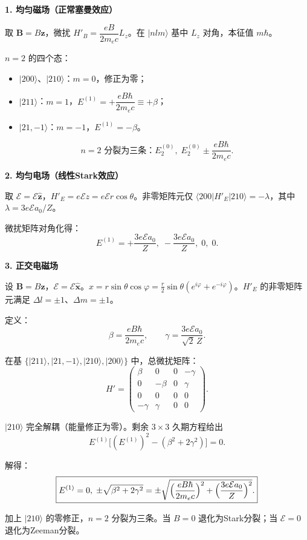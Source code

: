 \begin{derivationbox}[标准解题过程]
\textbf{1. 均匀磁场（正常塞曼效应）}

取 $\mathbf{B}=B\hat{\mathbf{z}}$，微扰 $H'_B=\dfrac{eB}{2m_ec}L_z$。在 $|nlm\rangle$ 基中 $L_z$ 对角，本征值 $m\hbar$。

$n=2$ 的四个态：
\begin{itemize}
    \item $|200\rangle$、$|210\rangle$：$m=0$，修正为零；
    \item $|211\rangle$：$m=1$，$E^{(1)}=+\dfrac{eB\hbar}{2m_ec}\equiv+\beta$；
    \item $|21,-1\rangle$：$m=-1$，$E^{(1)}=-\beta$。
\end{itemize}

\begin{equation}
\boxed{n=2\text{ 分裂为三条：}E_2^{(0)},\;E_2^{(0)}\pm\frac{eB\hbar}{2m_ec}.}
\end{equation}

\textbf{2. 均匀电场（线性Stark效应）}

取 $\boldsymbol{\mathcal{E}}=\mathcal{E}\hat{\mathbf{z}}$，$H'_E=e\mathcal{E}z=e\mathcal{E}r\cos\theta$。非零矩阵元仅 $\langle200|H'_E|210\rangle=-\lambda$，其中$\lambda=3e\mathcal{E}a_0/Z$。

微扰矩阵对角化得：
\begin{equation}
\boxed{E^{(1)}=+\frac{3e\mathcal{E}a_0}{Z},\;-\frac{3e\mathcal{E}a_0}{Z},\;0,\;0.}
\end{equation}

\textbf{3. 正交电磁场}

设 $\mathbf{B}=B\hat{\mathbf{z}}$，$\boldsymbol{\mathcal{E}}=\mathcal{E}\hat{\mathbf{x}}$。$x=r\sin\theta\cos\varphi=\frac{r}{2}\sin\theta(e^{i\varphi}+e^{-i\varphi})$。$H'_E$ 的非零矩阵元满足 $\Delta l=\pm1$、$\Delta m=\pm1$。

定义：
\[
\beta=\frac{eB\hbar}{2m_ec},\qquad\gamma=\frac{3e\mathcal{E}a_0}{\sqrt2\,Z}.
\]

在基 $\{|211\rangle,|21,-1\rangle,|210\rangle,|200\rangle\}$ 中，总微扰矩阵：
\[
H'=\begin{pmatrix}\beta&0&0&-\gamma\\0&-\beta&0&\gamma\\0&0&0&0\\-\gamma&\gamma&0&0\end{pmatrix}.
\]

$|210\rangle$ 完全解耦（能量修正为零）。剩余 $3\times3$ 久期方程给出
\[
E^{(1)}\bigl[(E^{(1)})^2-(\beta^2+2\gamma^2)\bigr]=0.
\]

解得：
\begin{equation}
\boxed{E^{(1)}=0,\;\pm\sqrt{\beta^2+2\gamma^2}=\pm\sqrt{\Bigl(\frac{eB\hbar}{2m_ec}\Bigr)^2+\Bigl(\frac{3e\mathcal{E}a_0}{Z}\Bigr)^2}.}
\end{equation}

加上 $|210\rangle$ 的零修正，$n=2$ 分裂为三条。当 $B=0$ 退化为Stark分裂；当 $\mathcal{E}=0$ 退化为Zeeman分裂。
\end{derivationbox}

